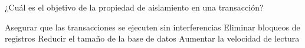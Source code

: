\question[1] ¿Cuál es el objetivo de la propiedad de aislamiento en una transacción?
\begin{choices}
\CorrectChoice Asegurar que las transacciones se ejecuten sin interferencias
\choice Eliminar bloqueos de registros
\choice Reducir el tamaño de la base de datos
\choice Aumentar la velocidad de lectura
\end{choices}